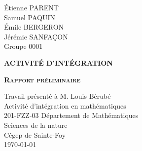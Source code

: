 \begin{titlepage}
    \noindent
    Étienne PARENT\\
    Samuel PAQUIN \\
    Émile BERGERON\\
    Jérémie SANFAÇON\\
    \noindent
    Groupe 0001


    \indent
	\centering
	\vspace{2cm}

	{\scshape\textbf{ACTIVITÉ D'INTÉGRATION}}\\
	{\scshape\textbf{Rapport préliminaire}\par}
	\vspace{2cm}
	{Travail présenté à M.  Louis Bérubé}\\
	\vspace{2cm}
	{Activité d'intégration en mathématiques}\\
    {201-FZZ-03}
	\vfill
	{Département de Mathématiques}\\
	{Sciences de la nature}\\
	{Cégep de Sainte-Foy}\\
	{\large \today}
\end{titlepage}
